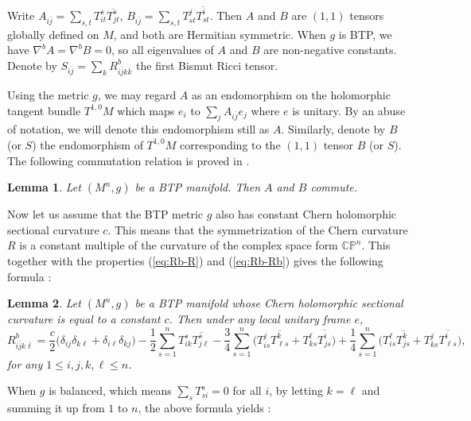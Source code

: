 \documentclass{amsart}
\newtheorem{lemma}{Lemma}
\begin{document}
Write $A_{i\bar{j}} = \sum_{s,t} T^s_{it} \overline{ T^s_{jt}}$, $B_{i\bar{j}} = \sum_{s,t} T^j_{st} \overline{ T^i_{st}}$. Then $A$ and $B$ are $(1,1)$ tensors globally defined on $M$, and both are Hermitian symmetric. When $g$ is BTP, we have $\nabla^bA=\nabla^bB=0$, so all eigenvalues of $A$ and $B$ are non-negative constants. Denote by $S_{i\bar{j}}=\sum_k R^b_{i\bar{j}k\bar{k}}$ the first Bismut Ricci tensor.

Using the metric $g$, we may regard $A$ as an endomorphism on the holomorphic tangent bundle $T^{1,0}M$ which maps $e_i$ to $\sum_j A_{i\bar{j}}e_j$ where $e$ is unitary. By an abuse of notation, we will denote this endomorphism still as $A$. Similarly, denote by $B$ (or $S$) the endomorphism of $T^{1,0}M$ corresponding to the $(1,1)$ tensor $B$ (or $S$).  The following commutation relation is proved in \cite[Proposition 1.5]{ZhaoZ24}.


\begin{lemma} \label{lemma2}
Let $(M^n,g)$ be a BTP manifold. Then  $A$   and  $B$   commute.
\end{lemma}

 Now let us assume that the BTP metric  $g$ also has constant Chern holomorphic sectional curvature $c$. This means that the symmetrization of the Chern curvature $R$ is a constant multiple of the curvature of the complex space form ${\mathbb C}{\mathbb P}^n$. This together with the properties (\ref{eq:Rb-R}) and (\ref{eq:Rb-Rb})  gives the following formula \cite[Lemma 8]{ChenZ26}:


\begin{lemma} \label{lemmaRb}
Let $(M^n,g)$ be a BTP manifold whose Chern holomorphic sectional curvature is equal to a constant $c$. Then under any local unitary frame $e$,
\begin{equation} \label{eq:Rb}
R^b_{i\bar{j}k\bar{\ell}} = \frac{c}{2} \big( \delta_{ij}\delta_{k\ell} + \delta_{i\ell}\delta_{kj} \big) - \frac{1}{2}\sum_{s=1}^n T^s_{ik} \overline{ T^s_{j\ell }} - \frac{3}{4}\sum_{s=1}^n \big( T^j_{is} \overline{ T^k_{\ell s}} + T^{\ell}_{ks} \overline{ T^i_{j s}}  \big) + \frac{1}{4}\sum_{s=1}^n \big( T^{\ell}_{is} \overline{ T^k_{j s}} + T^{j}_{ks} \overline{ T^i_{\ell s}}  \big),
\end{equation}
for any $1\leq i,j,k,\ell \leq n$.
\end{lemma}

When $g$ is balanced, which means $\sum_s T^s_{si}=0$ for all $i$, by letting $k=\ell$ and summing it up from $1$ to $n$, the above formula yields \cite[Lemma 2]{WZ}:
\end{document}
